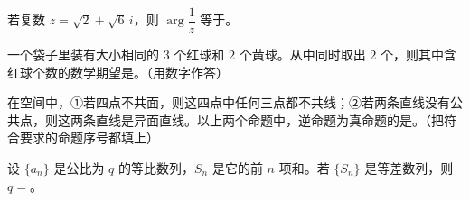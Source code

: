 \begin{question}
若复数 $z=\sqrt2+\sqrt6\,i$，则 $\arg\dfrac1z$ 等于\gkblank{}。

\end{question}
\begin{question}
一个袋子里装有大小相同的 $3$ 个红球和 $2$ 个黄球。从中同时取出 $2$ 个，则其中含红球个数的数学期望是\gkblank{}。（用数字作答）

\end{question}
\begin{question}
在空间中，①若四点不共面，则这四点中任何三点都不共线；②若两条直线没有公共点，则这两条直线是异面直线。以上两个命题中，逆命题为真命题的是\gkblank{}。（把符合要求的命题序号都填上）

\end{question}
\begin{question}
设 $\{a_n\}$ 是公比为 $q$ 的等比数列，$S_n$ 是它的前 $n$ 项和。若 $\{S_n\}$ 是等差数列，则 $q=$\gkblank{}。

\end{question}

